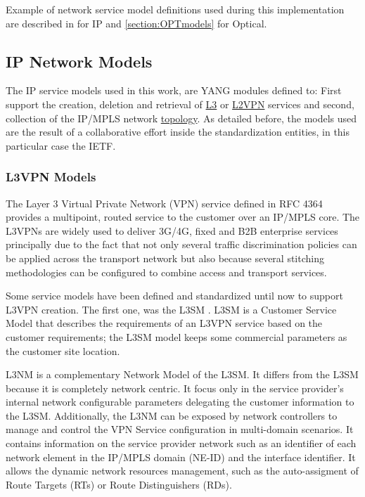 \documentclass[a4paper,fleqn]{cas-dc}
\begin{document}
Example of network service model definitions used during this implementation are described in  for IP and \cref{section:OPTmodels} for Optical.

\subsection{IP Network Models}
\label{section:IPmodels}

The IP service models used in this work, are YANG modules defined to: First support the creation, deletion and retrieval of \hyperref[section:l3nm]{L3} or \hyperref[section:l2nm]{L2VPN} services and second, collection of the IP/MPLS network \hyperref[subsection:IPtopo]{topology}. As detailed before, the models used are the result of a collaborative effort inside the standardization entities, in this particular case the IETF.

\subsubsection{L3VPN Models}
\label{section:l3nm}
The Layer 3 Virtual Private Network (VPN) service defined in RFC 4364 \cite{rosen2006rfc} provides a multipoint, routed service to the customer over an IP/MPLS core. The L3VPNs are widely used to deliver 3G/4G, fixed and B2B enterprise services principally due to the fact that not only several traffic discrimination policies can be applied across the transport network but also because several stitching methodologies can be configured to combine access and transport services. 

Some service models have been defined and standardized until now to support L3VPN creation. The first one, was the L3SM \cite{rfc8299}. L3SM is a Customer Service Model that describes the requirements of an L3VPN service based on the customer requirements; the L3SM model keeps some commercial parameters as the customer site location.

L3NM \cite{voyer2019internet} is a complementary Network Model of the L3SM. It differs from the L3SM because it is completely network centric. It focus only in the service provider's internal network configurable parameters delegating the customer information to the L3SM. Additionally, the L3NM can be exposed by network controllers to manage and control the VPN Service configuration in multi-domain scenarios. It contains information on the service provider network such as an identifier of each network element in the IP/MPLS domain (NE-ID) and the interface identifier. It allows the dynamic network resources management, such as the auto-assigment of Route Targets (RTs) or Route Distinguishers (RDs).
\end{document}
